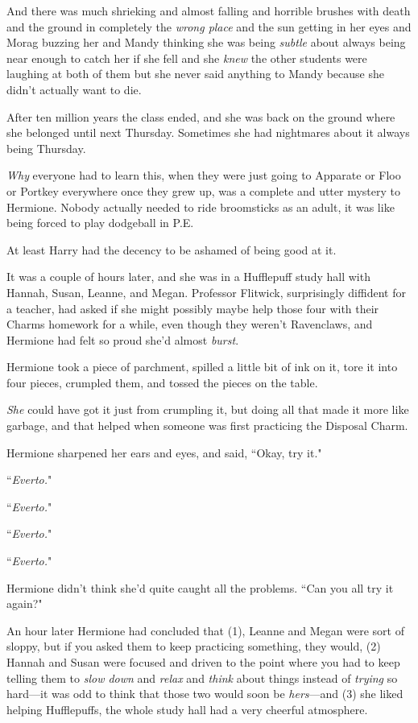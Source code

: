 And there was much shrieking and almost falling and horrible brushes with death and the ground in completely the \emph{wrong place} and the sun getting in her eyes and Morag buzzing her and Mandy thinking she was being \emph{subtle} about always being near enough to catch her if she fell and she \emph{knew} the other students were laughing at both of them but she never said anything to Mandy because she didn't actually want to die.

After ten million years the class ended, and she was back on the ground where she belonged until next Thursday. Sometimes she had nightmares about it always being Thursday.

\emph{Why} everyone had to learn this, when they were just going to Apparate or Floo or Portkey everywhere once they grew up, was a complete and utter mystery to Hermione. Nobody actually needed to ride broomsticks as an adult, it was like being forced to play dodgeball in P.E.

At least Harry had the decency to be ashamed of being good at it.

\later

It was a couple of hours later, and she was in a Hufflepuff study hall with Hannah, Susan, Leanne, and Megan. Professor Flitwick, surprisingly diffident for a teacher, had asked if she might possibly maybe help those four with their Charms homework for a while, even though they weren't Ravenclaws, and Hermione had felt so proud she'd almost \emph{burst}.

Hermione took a piece of parchment, spilled a little bit of ink on it, tore it into four pieces, crumpled them, and tossed the pieces on the table.

\emph{She} could have got it just from crumpling it, but doing all that made it more like garbage, and that helped when someone was first practicing the Disposal Charm.

Hermione sharpened her ears and eyes, and said, ``Okay, try it."

``\emph{Everto.}"

``\emph{Everto.}"

``\emph{Everto.}"

``\emph{Everto.}"

Hermione didn't think she'd quite caught all the problems. ``Can you all try it again?"

An hour later Hermione had concluded that (1), Leanne and Megan were sort of sloppy, but if you asked them to keep practicing something, they would, (2) Hannah and Susan were focused and driven to the point where you had to keep telling them to \emph{slow down} and \emph{relax} and \emph{think} about things instead of \emph{trying} so hard---it was odd to think that those two would soon be \emph{hers}---and (3) she liked helping Hufflepuffs, the whole study hall had a very cheerful atmosphere.

